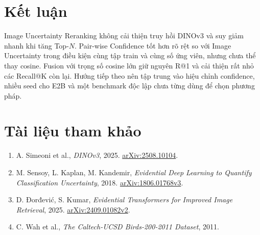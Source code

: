 \documentclass[11pt,a4paper]{article}
\begin{document}
\section{Kết luận}
Image Uncertainty Reranking không cải thiện truy hồi DINOv3 và suy giảm nhanh
khi tăng Top-$N$. Pair-wise Confidence tốt hơn rõ rệt so với Image Uncertainty
trong điều kiện cùng tập train và cùng số ứng viên, nhưng chưa thể thay cosine.
Fusion với trọng số cosine lớn giữ nguyên R@1 và cải thiện rất nhỏ các Recall@K
còn lại. Hướng tiếp theo nên tập trung vào hiệu chỉnh confidence, nhiều seed
cho E2B và một benchmark độc lập chưa từng dùng để chọn phương pháp.

\section*{Tài liệu tham khảo}
\begin{enumerate}
  \item A. Simeoni et al., \emph{DINOv3}, 2025.
  \href{https://arxiv.org/abs/2508.10104}{arXiv:2508.10104}.
  \item M. Sensoy, L. Kaplan, M. Kandemir, \emph{Evidential Deep Learning to
  Quantify Classification Uncertainty}, 2018.
  \href{https://arxiv.org/abs/1806.01768v3}{arXiv:1806.01768v3}.
  \item D. Đorđević, S. Kumar, \emph{Evidential Transformers for Improved
  Image Retrieval}, 2025.
  \href{https://arxiv.org/abs/2409.01082v2}{arXiv:2409.01082v2}.
  \item C. Wah et al., \emph{The Caltech-UCSD Birds-200-2011 Dataset}, 2011.
\end{enumerate}
\end{document}

